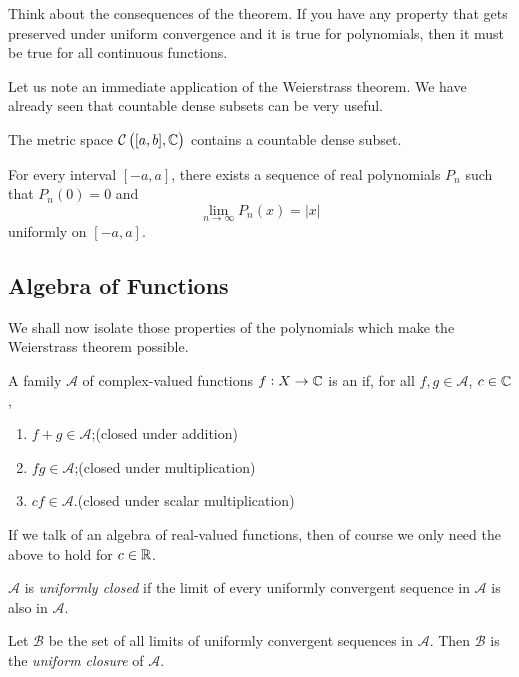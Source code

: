 Think about the consequences of the theorem. If you have any property that gets preserved under uniform convergence and it is true for polynomials, then it must be true for all continuous functions.

Let us note an immediate application of the Weierstrass theorem. We have already seen that countable dense subsets can be very useful.

\begin{corollary}
The metric space $\mathcal{C}\left([a,b],\mathbb C\right)$ contains a countable dense subset.
\end{corollary}

\begin{corollary}
For every interval $[-a,a]$, there exists a sequence of real polynomials $P_n$ such that $P_n(0)=0$ and
\[\lim_{n\to\infty}P_n(x)=|x|\]
uniformly on $[-a,a]$.
\end{corollary}

\subsection{Algebra of Functions}
We shall now isolate those properties of the polynomials which make the Weierstrass theorem possible.

\begin{definition}
A family $\mathscr{A}$ of complex-valued functions $f:X\to\mathbb C$ is an  if, for all $f,g\in\mathscr{A}$, $c\in\mathbb C$,
\begin{enumerate}[label=(\roman*)]
\item $f+g\in\mathscr{A}$;\hfill(closed under addition)
\item $fg\in\mathscr{A}$;\hfill(closed under multiplication)
\item $cf\in\mathscr{A}$.\hfill(closed under scalar multiplication)
\end{enumerate}
If we talk of an algebra of real-valued functions, then of course we only need the above to hold for $c\in\mathbb R$.

$\mathscr{A}$ is \emph{uniformly closed} if the limit of every uniformly convergent sequence in $\mathscr{A}$ is also in $\mathscr{A}$.

Let $\mathscr{B}$ be the set of all limits of uniformly convergent sequences in $\mathscr{A}$. Then $\mathscr{B}$ is the \emph{uniform closure} of $\mathscr{A}$.
\end{definition}

\begin{example}

\end{example}

